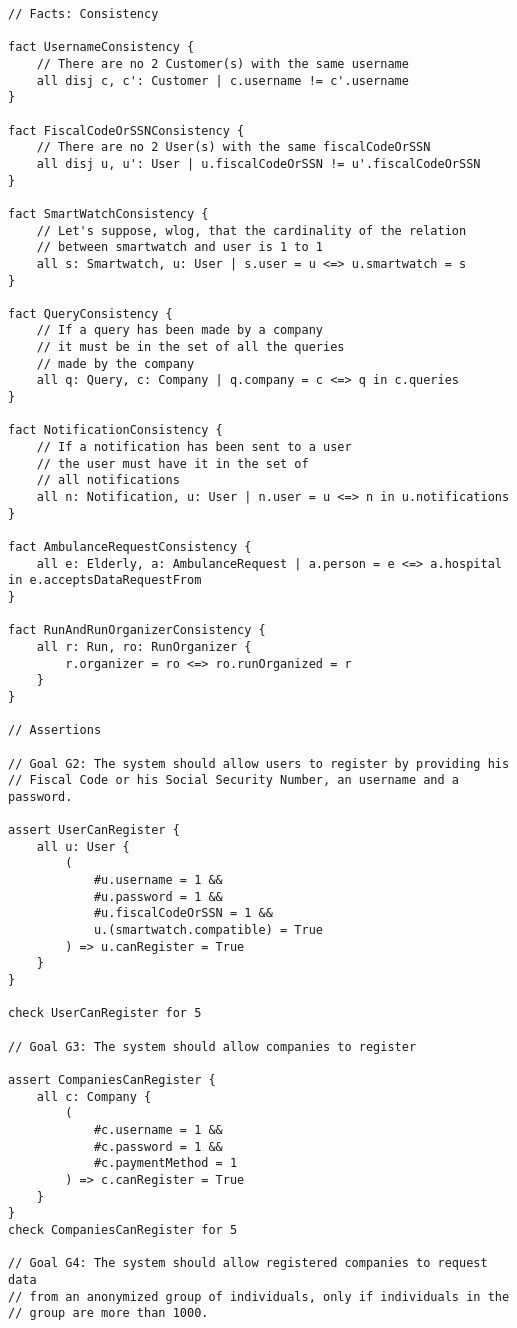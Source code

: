 \begin{verbatim}
// Facts: Consistency

fact UsernameConsistency {
    // There are no 2 Customer(s) with the same username
    all disj c, c': Customer | c.username != c'.username
}

fact FiscalCodeOrSSNConsistency {
    // There are no 2 User(s) with the same fiscalCodeOrSSN
    all disj u, u': User | u.fiscalCodeOrSSN != u'.fiscalCodeOrSSN
}

fact SmartWatchConsistency {
    // Let's suppose, wlog, that the cardinality of the relation
    // between smartwatch and user is 1 to 1
    all s: Smartwatch, u: User | s.user = u <=> u.smartwatch = s
}

fact QueryConsistency {
    // If a query has been made by a company
    // it must be in the set of all the queries 
    // made by the company
    all q: Query, c: Company | q.company = c <=> q in c.queries
}

fact NotificationConsistency {
    // If a notification has been sent to a user
    // the user must have it in the set of 
    // all notifications
    all n: Notification, u: User | n.user = u <=> n in u.notifications
}

fact AmbulanceRequestConsistency {
    all e: Elderly, a: AmbulanceRequest | a.person = e <=> a.hospital in e.acceptsDataRequestFrom
}

fact RunAndRunOrganizerConsistency {
    all r: Run, ro: RunOrganizer {
        r.organizer = ro <=> ro.runOrganized = r
    }
}

// Assertions 

// Goal G2: The system should allow users to register by providing his 
// Fiscal Code or his Social Security Number, an username and a password. 

assert UserCanRegister {
    all u: User {
        (
            #u.username = 1 && 
            #u.password = 1 && 
            #u.fiscalCodeOrSSN = 1 &&
            u.(smartwatch.compatible) = True
        ) => u.canRegister = True
    }
}

check UserCanRegister for 5

// Goal G3: The system should allow companies to register

assert CompaniesCanRegister {
    all c: Company {
        (
            #c.username = 1 && 
            #c.password = 1 &&  
            #c.paymentMethod = 1 
        ) => c.canRegister = True
    }
}
check CompaniesCanRegister for 5

// Goal G4: The system should allow registered companies to request data
// from an anonymized group of individuals, only if individuals in the
// group are more than 1000.


\end{verbatim}
